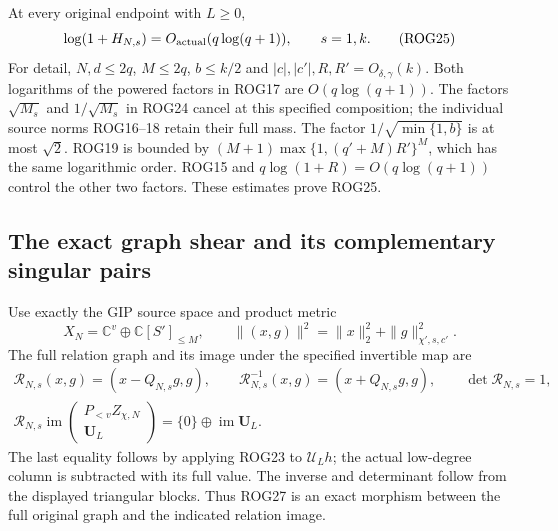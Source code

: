 \documentclass[11pt,a4paper]{article}
\begin{document}
At every original endpoint with $L\ge0$,
\[
 \log(1+H_{N,s})=O_{\rm actual}(q\log(q+1)),
                    \qquad s=1,k.
 \tag{ROG25}
\]
For detail, $N,d\le2q$, $M\le2q$, $b\le k/2$ and
$|c|,|c'|,R,R'=O_{\delta,\gamma}(k)$. Both logarithms
of the powered factors in ROG17 are $O(q\log(q+1))$.
The factors $\sqrt{M_s}$ and $1/\sqrt{M_s}$ in ROG24
cancel at this specified composition; the individual source
norms ROG16--18 retain their full mass. The factor
$1/\sqrt{\min\{1,b\}}$ is at most $\sqrt2$.
ROG19 is bounded by
$(M+1)\max\{1,(q'+M)R'\}^{M}$, which has the same
logarithmic order. ROG15 and $q\log(1+R)=O(q\log(q+1))$
control the other two factors. These estimates prove ROG25.

\subsection{The exact graph shear and its complementary singular pairs}

Use exactly the GIP source space and product metric
\[
 X_N=\mathbb C^v\oplus\mathbb C[S']_{\le M},\qquad
 \|(x,g)\|^2=\|x\|_2^2+\|g\|_{\chi',s,c'}^2.
 \tag{ROG26}
\]
The full relation graph and its image under the specified
invertible map are
\[
 \begin{gathered}
 \mathcal R_{N,s}(x,g)=(x-Q_{N,s}g,g),\qquad
 \mathcal R_{N,s}^{-1}(x,g)=(x+Q_{N,s}g,g),\qquad
 \det\mathcal R_{N,s}=1,\\
 \mathcal R_{N,s}\operatorname{im}
       \begin{pmatrix}P_{<v}Z_{\chi,N}\\\mathbf U_L\end{pmatrix}
       =\{0\}\oplus\operatorname{im}\mathbf U_L .
 \end{gathered}\tag{ROG27}
\]
The last equality follows by applying ROG23 to $\mathcal U_Lh$;
the actual low-degree column is subtracted with its full value.
The inverse and determinant follow from the displayed triangular
blocks. Thus ROG27 is an exact morphism between the full
original graph and the indicated relation image.
\end{document}
